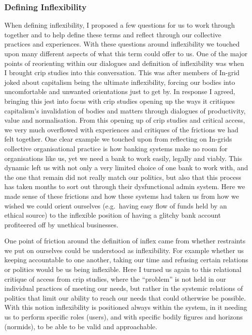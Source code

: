 \hypertarget{defining-inflexibility}{%
\subsubsection{Defining Inflexibility}\label{defining-inflexibility}}

When defining inflexibility, I proposed a few questions for us to work
through together and to help define these terms and reflect through our
collective practices and experiences. With these questions around
inflexibility we touched upon many different aspects of what this term
could offer to us. One of the major points of reorienting within our
dialogues and definition of inflexibility was when I brought crip
studies into this conversation. This was after members of In-grid joked
about capitalism being the ultimate inflexibility, forcing our bodies
into uncomfortable and unwanted orientations just to get by. In response
I agreed, bringing this jest into focus with crip studies opening up the
ways it critiques capitalism's invalidation of bodies and matters
through dialogues of productivity, value and normalisation. From this
opening up of crip studies and critical access, we very much overflowed
with experiences and critiques of the frictions we had felt together.
One clear example we touched upon from reflecting on In-grids collective
organisational practice is how banking systems make no room for
organisations like us, yet we need a bank to work easily, legally and
viably. This dynamic left us with not only a very limited choice of one
bank to work with, and the one that remain did not really match our
politics, but also that this process has taken months to sort out
through their dysfunctional admin system. Here we made sense of these
frictions and how these systems had taken us from how we wished we could
orient ourselves (e.g.~having easy flow of funds held by an ethical
source) to the inflexible position of having a glitchy bank account
profiteered off by unethical businesses.

One point of friction around the definition of inflex came from whether
restraints we put on ourselves could be understood as inflexibility. For
example whether us keeping accountable to one another, taking our time
and refusing certain relations or politics would be us being inflexible.
Here I turned us again to this relational critique of access from crip
studies, where the ``problem'' is not held in our individual practices
of meeting our needs, but rather in the systemic relations of politics
that limit our ability to reach our needs that could otherwise be
possible. With this notion inflexibility is positioned always within the
system, in it needing us to perform specific roles (users), and with
specific bodily figures and horizons (normids), to be able to be valid
and approachable.


